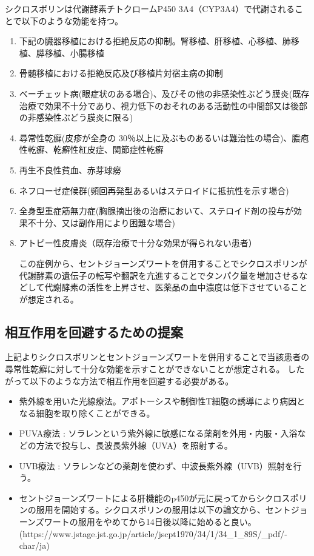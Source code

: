 \documentclass[a4paper,papersize,dvipdfmx]{jsarticle}
\begin{document}
シクロスポリンは代謝酵素チトクロームP450 3A4（CYP3A4）で代謝されることで以下のような効能を持つ。


\begin{enumerate}
\item 下記の臓器移植における拒絶反応の抑制。腎移植、肝移植、心移植、肺移植、膵移植、小腸移植
\item 骨髄移植における拒絶反応及び移植片対宿主病の抑制
\item ベーチェット病(眼症状のある場合)、及びその他の非感染性ぶどう膜炎(既存治療で効果不十分であり、視力低下のおそれのある活動性の中間部又は後部の非感染性ぶどう膜炎に限る)
\item 尋常性乾癬(皮疹が全身の 30％以上に及ぶものあるいは難治性の場合)、膿疱性乾癬、乾癬性紅皮症、関節症性乾癬
\item 再生不良性貧血、赤芽球癆
\item ネフローゼ症候群(頻回再発型あるいはステロイドに抵抗性を示す場合)
\item 全身型重症筋無力症(胸腺摘出後の治療において、ステロイド剤の投与が効果不十分、又は副作用により困難な場合)
\item アトピー性皮膚炎（既存治療で十分な効果が得られない患者）


この症例から、セントジョーンズワートを併用することでシクロスポリンが代謝酵素の遺伝子の転写や翻訳を亢進することでタンパク量を増加させるなどして代謝酵素の活性を上昇させ、医薬品の血中濃度は低下させていることが想定される。



\end{enumerate}
\subsection*{相互作用を回避するための提案}
上記よりシクロスポリンとセントジョーンズワートを併用することで当該患者の尋常性乾癬に対して十分な効能を示すことができないことが想定される。
したがって以下のような方法で相互作用を回避する必要がある。

\begin{itemize}
\item 紫外線を用いた光線療法。アポトーシスや制御性T細胞の誘導により病因となる細胞を取り除くことができる。
\item PUVA療法 : ソラレンという紫外線に敏感になる薬剤を外用・内服・入浴などの方法で投与し、長波長紫外線（UVA）を照射する。
\item UVB療法 : ソラレンなどの薬剤を使わず、中波長紫外線（UVB）照射を行う。

\item セントジョーンズワートによる肝機能のp450が元に戻ってからシクロスポリンの服用を開始する。シクロスポリンの服用は以下の論文から、セントジョーンズワートの服用をやめてから14日後以降に始めると良い。(https://www.jstage.jst.go.jp/article/jscpt1970/34/1/34\_1\_89S/\_pdf/-char/ja)

\end{itemize}
\end{document}
